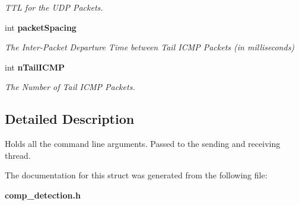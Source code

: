 \begin{DoxyCompactItemize}
\begin{DoxyCompactList}\small\item\em T\-T\-L for the U\-D\-P Packets. \end{DoxyCompactList}\item 
int {\bf packet\-Spacing}\label{structargs_af55942e03e0e4c2a9155b9d15e19f793}

\begin{DoxyCompactList}\small\item\em The Inter-\/\-Packet Departure Time between Tail I\-C\-M\-P Packets (in milliseconds) \end{DoxyCompactList}\item 
int {\bf n\-Tail\-I\-C\-M\-P}\label{structargs_ab565ed3f4e45736a683cfaf5f69f8651}

\begin{DoxyCompactList}\small\item\em The Number of Tail I\-C\-M\-P Packets. \end{DoxyCompactList}\end{DoxyCompactItemize}


\subsection{Detailed Description}
Holds all the command line arguments. Passed to the sending and receiving thread. 

The documentation for this struct was generated from the following file\-:\begin{DoxyCompactItemize}
\item 
{\bf comp\-\_\-detection.\-h}\end{DoxyCompactItemize}
